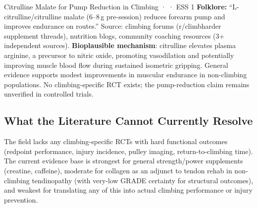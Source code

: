 \begin{folklorebox}{Citrulline Malate for Pump Reduction in Climbing · \folkloreverified · ESS 1}
\textbf{Folklore:} ``L-citrulline/citrulline malate (6--8\,g pre-session) reduces forearm pump and improves endurance on routes.'' Source: climbing forums (r/climbharder supplement threads), nutrition blogs, community coaching resources (3+ independent sources). \textbf{Bioplausible mechanism}: citrulline elevates plasma arginine, a precursor to nitric oxide, promoting vasodilation and potentially improving muscle blood flow during sustained isometric gripping. General evidence supports modest improvements in muscular endurance in non-climbing populations. No climbing-specific RCT exists; the pump-reduction claim remains unverified in controlled trials.
\end{folklorebox}

\subsection{What the Literature Cannot Currently Resolve}
\label{subsec:suppgaps}

The field lacks any climbing-specific RCTs with hard functional outcomes (redpoint performance, injury incidence, pulley imaging, return-to-climbing time). The current evidence base is strongest for general strength/power supplements (creatine, caffeine), moderate for collagen as an adjunct to tendon rehab in non-climbing tendinopathy (with very-low GRADE certainty for structural outcomes), and weakest for translating any of this into actual climbing performance or injury prevention.

